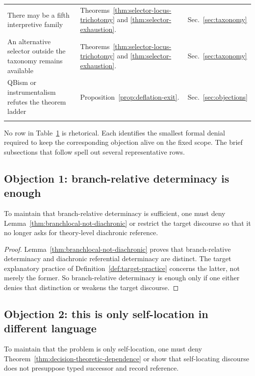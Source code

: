 \begin{longtable}{>{\raggedright\arraybackslash}p{} >{\raggedright\arraybackslash}p{} >{\raggedright\arraybackslash}p{}}
\addlinespace
There may be a fifth interpretive family & Theorems~\ref{thm:selector-locus-trichotomy} and \ref{thm:selector-exhaustion}. & Sec.~\ref{sec:taxonomy} \\
\addlinespace
An alternative selector outside the taxonomy remains available & Theorems~\ref{thm:selector-locus-trichotomy} and \ref{thm:selector-exhaustion}. & Sec.~\ref{sec:taxonomy} \\
\addlinespace
QBism or instrumentalism refutes the theorem ladder & Proposition~\ref{prop:deflation-exit}. & Sec.~\ref{sec:objections} \\
\bottomrule
\label{tab:strict-denial-table}
\end{longtable}

No row in Table~\ref{tab:strict-denial-table} is rhetorical. Each identifies the smallest formal denial
required to keep the corresponding objection alive on the fixed scope. The brief subsections that follow
spell out several representative rows.

\subsection{Objection 1: branch-relative determinacy is enough}

\begin{proposition}
\label{prop:branch-relative-not-enough}
To maintain that branch-relative determinacy is sufficient, one must deny
Lemma~\ref{thm:branchlocal-not-diachronic} or restrict the target discourse so that it no longer asks
for theory-level diachronic reference.
\end{proposition}

\begin{proof}
Lemma~\ref{thm:branchlocal-not-diachronic} proves that branch-relative determinacy and diachronic
referential determinacy are distinct. The target explanatory practice of
Definition~\ref{def:target-practice} concerns the latter, not merely the former. So branch-relative
determinacy is enough only if one either denies that distinction or weakens the target discourse.
\end{proof}

\subsection{Objection 2: this is only self-location in different language}

\begin{proposition}
\label{prop:self-location-downstream}
To maintain that the problem is only self-location, one must deny
Theorem~\ref{thm:decision-theoretic-dependence} or show that self-locating discourse does not
presuppose typed successor and record reference.
\end{proposition}

